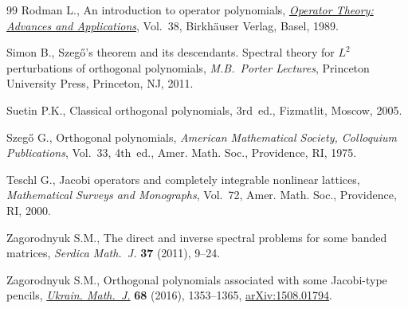 \documentclass[pdftex]{sigma}
\numberwithin{equation}{section}
\begin{document}
\begin{thebibliography}{99}
Rodman L., An introduction to operator polynomials, \href{https://doi.org/10.1007/978-3-0348-9152-3}{\textit{Operator Theory:
 Advances and Applications}}, Vol.~38, Birkh\"auser Verlag, Basel, 1989.

Simon B., Szeg\H{o}'s theorem and its descendants. Spectral theory for $L^2$
 perturbations of orthogonal polynomials, \textit{M.B.~Porter Lectures}, Princeton
 University Press, Princeton, NJ, 2011.

Suetin P.K., Classical orthogonal polynomials, 3rd~ed., Fizmatlit, Moscow,
 2005.

Szeg\H{o} G., Orthogonal polynomials, \textit{American Mathematical Society,
 Colloquium Publications}, Vol.~33, 4th~ed., Amer. Math. Soc., Providence, RI,
 1975.

Teschl G., Jacobi operators and completely integrable nonlinear lattices,
 \textit{Mathematical Surveys and Monographs}, Vol.~72, Amer. Math. Soc.,
 Providence, RI, 2000.

Zagorodnyuk S.M., The direct and inverse spectral problems for some banded
 matrices, \textit{Serdica Math.~J.} \textbf{37} (2011), 9--24.

Zagorodnyuk S.M., Orthogonal polynomials associated with some {J}acobi-type
 pencils, \href{https://doi.org/10.1007/s11253-017-1300-3}{\textit{Ukrain. Math.~J.}} \textbf{68} (2016), 1353--1365,
 \href{https://arxiv.org/abs/1508.01794}{arXiv:1508.01794}.

\end{thebibliography}\LastPageEnding
\end{document}
